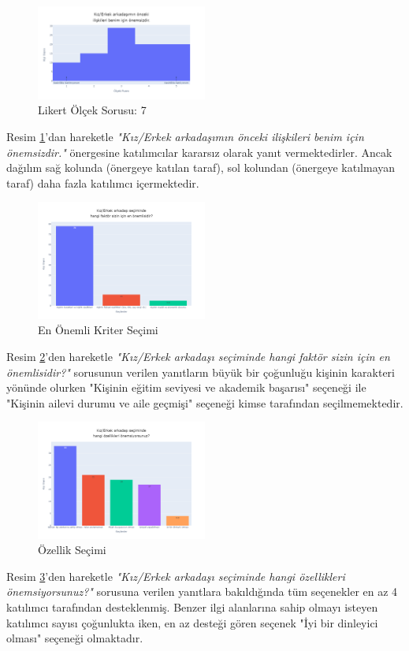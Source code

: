\documentclass{article}
\begin{document}
\begin{twocolumn}
    \begin{figure}[htbp]
        \centering
        \includegraphics[width=0.5\textwidth]{Imgs/likert7.png}
        \caption{Likert Ölçek Sorusu: 7}
        \label{likert7}
    \end{figure}
Resim \ref{likert7}'dan hareketle \textit{"Kız/Erkek arkadaşımın önceki ilişkileri benim için önemsizdir."} önergesine katılımcılar kararsız olarak yanıt vermektedirler. Ancak dağılım sağ kolunda (önergeye katılan taraf), sol kolundan (önergeye katılmayan taraf) daha fazla katılımcı içermektedir.

    \begin{figure}[htbp]
        \centering
        \includegraphics[width=0.5\textwidth]{Imgs/soru10.png}
        \caption{En Önemli Kriter Seçimi}
        \label{soru10}
    \end{figure}
Resim \ref{soru10}'den hareketle \textit{"Kız/Erkek arkadaşı seçiminde hangi faktör sizin için en önemlisidir?"} sorusunun verilen yanıtların büyük bir çoğunluğu kişinin karakteri yönünde olurken "Kişinin eğitim seviyesi ve akademik başarısı" seçeneği ile "Kişinin ailevi durumu ve aile geçmişi" seçeneği kimse tarafından seçilmemektedir.

\clearpage
    \begin{figure}[htbp]
        \centering
        \includegraphics[width=0.5\textwidth]{Imgs/soru11.png}
        \caption{Özellik Seçimi}
        \label{soru11}
    \end{figure}
Resim \ref{soru11}'den hareketle \textit{"Kız/Erkek arkadaşı seçiminde hangi özellikleri önemsiyorsunuz?"} sorusuna verilen yanıtlara bakıldığında tüm seçenekler en az 4 katılımcı tarafından desteklenmiş. Benzer ilgi alanlarına sahip olmayı isteyen katılımcı sayısı çoğunlukta iken, en az desteği gören seçenek "İyi bir dinleyici olması" seçeneği olmaktadır.


\end{twocolumn}
\end{document}
